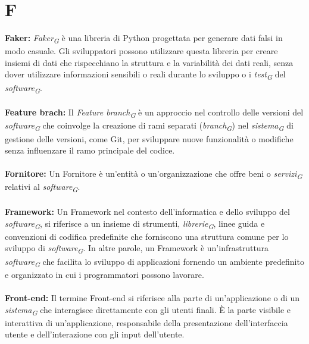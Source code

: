 \documentclass{article}
\begin{document}
\section*{F}
{}
\textbf{Faker:} \textit{Faker}\textsubscript{\textit{G}} è una libreria di Python progettata per generare dati falsi in modo casuale. Gli sviluppatori possono utilizzare questa libreria per creare insiemi di dati che rispecchiano la struttura e la variabilità dei dati reali, senza dover utilizzare informazioni sensibili o reali durante lo sviluppo o i \textit{test}\textsubscript{\textit{G}} del \textit{software}\textsubscript{\textit{G}}.
\\
\\
\textbf{Feature brach:} Il \textit{Feature branch}\textsubscript{\textit{G}} è un approccio nel controllo delle versioni del \textit{software}\textsubscript{\textit{G}} che coinvolge la creazione di rami separati (\textit{branch}\textsubscript{\textit{G}}) nel \textit{sistema}\textsubscript{\textit{G}} di gestione delle versioni, come Git, per sviluppare nuove funzionalità o modifiche senza influenzare il ramo principale del codice.
\\
\\
\textbf{Fornitore:} Un Fornitore è un'entità o un'organizzazione che offre beni o \textit{servizi}\textsubscript{\textit{G}} relativi al \textit{software}\textsubscript{\textit{G}}.
\\
\\
\textbf{Framework:} Un Framework nel contesto dell'informatica e dello sviluppo del \textit{software}\textsubscript{\textit{G}}, si riferisce a un insieme di strumenti, \textit{librerie}\textsubscript{\textit{G}}, linee guida e convenzioni di codifica predefinite che forniscono una struttura comune per lo sviluppo di \textit{software}\textsubscript{\textit{G}}. In altre parole, un Framework è un'infrastruttura \textit{software}\textsubscript{\textit{G}} che facilita lo sviluppo di applicazioni fornendo un ambiente predefinito e organizzato in cui i programmatori possono lavorare.
\\
\\
\textbf{Front-end:} Il termine Front-end si riferisce alla parte di un'applicazione o di un \textit{sistema}\textsubscript{\textit{G}} che interagisce direttamente con gli utenti finali. È la parte visibile e interattiva di un'applicazione, responsabile della presentazione dell'interfaccia utente e dell'interazione con gli input dell'utente.
\pagebreak
\end{document}
